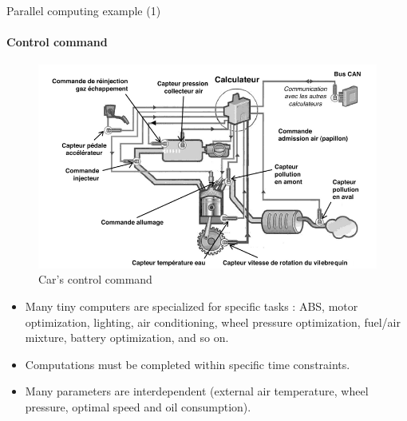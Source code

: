 \documentclass[compress,10pt,aspectratio=169]{beamer}
\begin{document}
\begin{frame}[fragile]{Parallel computing example (1)}
    \framesubtitle{Control command}
    \small
    \begin{multicols}{2}
    \begin{figure}[h]      
    \includegraphics[width=\linewidth]{../images/ControleCommande.png}
    \caption{Car's control command}
    \end{figure}
    \begin{itemize}
        \item Many tiny computers are specialized for specific tasks : ABS, motor optimization, lighting, air conditioning, wheel pressure optimization, 
              fuel/air mixture, battery optimization, and so on.
        \item Computations must be completed within specific time constraints.
        \item Many parameters are interdependent (external air temperature, wheel pressure, optimal speed and oil consumption).
    \end{itemize}
    \end{multicols}
\end{frame}
\end{document}
